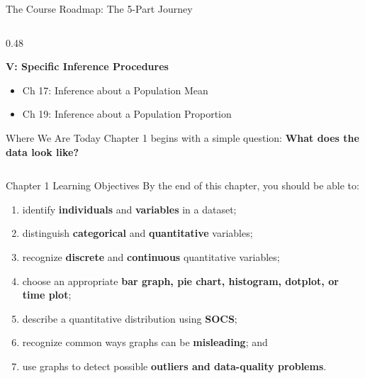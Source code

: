 \documentclass[aspectratio=169]{beamer}
\begin{document}
\begin{frame}{The Course Roadmap: The 5-Part Journey}
\begin{columns}[T]
\begin{column}{0.48\textwidth}
\begin{itemize}
      \end{itemize}
      \vspace{0.1cm}
      \textbf{V: Specific Inference Procedures}
      \begin{itemize}
        \item Ch 17: Inference about a Population Mean
        \item Ch 19: Inference about a Population Proportion
      \end{itemize}
      \vspace{0.2cm}
      \begin{block}{Where We Are Today}
        Chapter 1 begins with a simple question: \textbf{What does the data look like?}
      \end{block}
    \end{column}
  \end{columns}
\end{frame}

\begin{frame}{Chapter 1 Learning Objectives}
  By the end of this chapter, you should be able to:
  \begin{enumerate}
    \item identify \textbf{individuals} and \textbf{variables} in a dataset;
    \item distinguish \textbf{categorical} and \textbf{quantitative} variables;
    \item recognize \textbf{discrete} and \textbf{continuous} quantitative variables;
    \item choose an appropriate \textbf{bar graph, pie chart, histogram, dotplot, or time plot};
    \item describe a quantitative distribution using \textbf{SOCS};
    \item recognize common ways graphs can be \textbf{misleading}; and
    \item use graphs to detect possible \textbf{outliers and data-quality problems}.
  \end{enumerate}
\end{frame}
\end{document}

